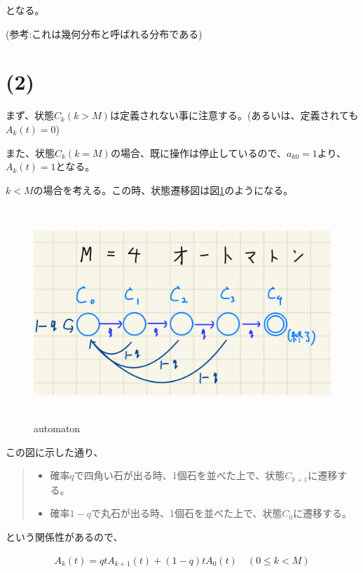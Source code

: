 \documentclass[a4paper, 10pt, dvipdfmx]{jlreq}
\begin{document}
となる。

(参考:これは幾何分布と呼ばれる分布である\cite{site:geo})

\section*{(2)}

まず、状態$C_k(k>M)$は定義されない事に注意する。(あるいは、定義されても$A_k(t)=0$)

また、状態$C_k(k=M)$の場合、既に操作は停止しているので、$a_{k0}=1$より、$A_k(t)=1$となる。

$k<M$の場合を考える。この時、状態遷移図は図\ref{img:automaton}のようになる。

\begin{figure}[htbp]
    \begin{center}
        \includegraphics[height=80mm]{automaton.png}
        \caption{automaton}
        \label{img:automaton}
    \end{center}
\end{figure}

この図に示した通り、

\begin{quote}
    \begin{itemize}
        \item 確率$q$で四角い石が出る時、1個石を並べた上で、状態$C_{k+1}$に遷移する。
        \item 確率$1-q$で丸石が出る時、1個石を並べた上で、状態$C_0$に遷移する。
    \end{itemize}
\end{quote}

という関係性があるので、

\begin{align*}
    A_k(t)=qtA_{k+1}(t)+(1-q)tA_0(t) \quad (0 \leq k < M)
\end{align*}
\end{document}
